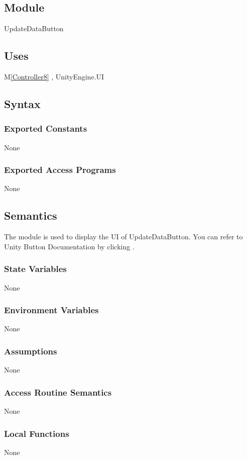 \documentclass[12pt, titlepage]{article}
\newcommand{\mref}[1]{M\ref{#1}}
\begin{document}
\subsection{Module}
UpdateDataButton

\subsection{Uses}
\mref{Controller8} , UnityEngine.UI 

\subsection{Syntax}
\subsubsection{Exported Constants}
None
\subsubsection{Exported Access Programs}
None

\subsection{Semantics}
The module is used to display the UI of UpdateDataButton. You can refer to Unity Button Documentation by clicking \bref.
\subsubsection{State Variables}
None
\subsubsection{Environment Variables}
None
\subsubsection{Assumptions}
None
\subsubsection{Access Routine Semantics}
None
\subsubsection{Local Functions}
None

\newpage

\end{document}
